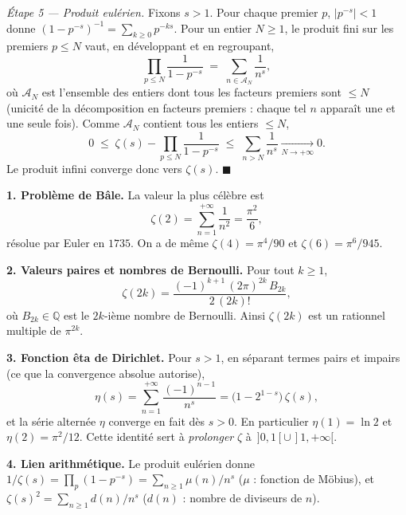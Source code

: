 \begin{mdframed}[style=proofbar]
  \medskip
  \textit{Étape 5 — Produit eulérien.}
  Fixons $s>1$. Pour chaque premier $p$, $|p^{-s}|<1$ donne
  $(1-p^{-s})^{-1}=\sum_{k\geq 0}p^{-ks}$. Pour un entier $N\geq 1$, le produit fini sur
  les premiers $p\leq N$ vaut, en développant et en regroupant,
  \[
    \prod_{p\leq N}\frac{1}{1-p^{-s}}
    \;=\; \sum_{n\in\mathcal{A}_{N}}\frac{1}{n^{s}},
  \]
  où $\mathcal{A}_{N}$ est l'ensemble des entiers dont tous les facteurs premiers
  sont $\leq N$ (unicité de la décomposition en facteurs premiers : chaque tel
  $n$ apparaît une et une seule fois). Comme $\mathcal{A}_{N}$ contient tous les
  entiers $\leq N$,
  \[
    0\;\leq\; \zeta(s)-\prod_{p\leq N}\frac{1}{1-p^{-s}}
    \;\leq\; \sum_{n>N}\frac{1}{n^{s}}\xrightarrow[N\to+\infty]{}0.
  \]
  Le produit infini converge donc vers $\zeta(s)$.
  \hfill$\blacksquare$
\end{mdframed}

\decsep{}



\begin{mdframed}[style=exbar]
  \textbf{1. Problème de Bâle.}\enspace{}%
  La valeur la plus célèbre est
  \[
    \zeta(2)=\sum_{n=1}^{+\infty}\frac{1}{n^{2}}=\frac{\pi^{2}}{6},
  \]
  résolue par Euler en $1735$. On a de même $\zeta(4)=\pi^{4}/90$ et
  $\zeta(6)=\pi^{6}/945$.

  \smallskip\noindent
  \textbf{2. Valeurs paires et nombres de Bernoulli.}\enspace%
  Pour tout $k\geq 1$,
  \[
    \zeta(2k)=\frac{(-1)^{k+1}\,(2\pi)^{2k}\,B_{2k}}{2\,(2k)!},
  \]
  où $B_{2k}\in\mathbb{Q}$ est le $2k$-ième nombre de Bernoulli. Ainsi
  $\zeta(2k)$ est un rationnel multiple de $\pi^{2k}$.

  \smallskip\noindent
  \textbf{3. Fonction êta de Dirichlet.}\enspace%
  Pour $s>1$, en séparant termes pairs et impairs (ce que la convergence
  absolue autorise),
  \[
    \eta(s)=\sum_{n=1}^{+\infty}\frac{(-1)^{n-1}}{n^{s}}
    =\bigl(1-2^{1-s}\bigr)\,\zeta(s),
  \]
  et la série alternée $\eta$ converge en fait dès $s>0$. En particulier
  $\eta(1)=\ln 2$ et $\eta(2)=\pi^{2}/12$. Cette identité sert à
  \emph{prolonger} $\zeta$ à $\,]0,1[\cup\,]1,+\infty[$.

  \smallskip\noindent
  \textbf{4. Lien arithmétique.}\enspace%
  Le produit eulérien donne $1/\zeta(s)=\prod_{p}(1-p^{-s})=\sum_{n\geq
  1}\mu(n)/n^{s}$ ($\mu$ : fonction de Möbius), et $\zeta(s)^{2}=\sum_{n\geq
  1}d(n)/n^{s}$ ($d(n)$ : nombre de diviseurs de $n$).
\end{mdframed}

